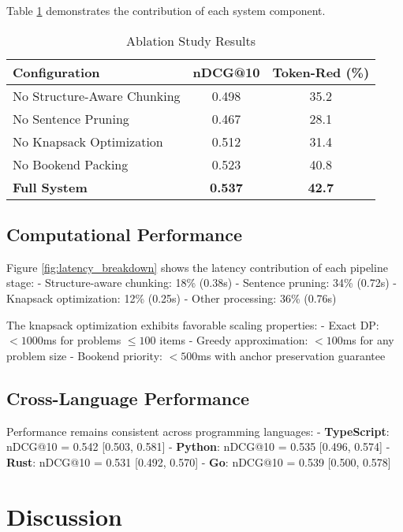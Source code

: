 \documentclass[conference]{IEEEtran}
\begin{document}
Table \ref{tab:ablation} demonstrates the contribution of each system component.

\begin{table}[htbp]
\caption{Ablation Study Results}
\begin{center}
\begin{tabular}{lcc}
\toprule
\textbf{Configuration} & \textbf{nDCG@10} & \textbf{Token-Red (\%)} \\
\midrule
No Structure-Aware Chunking & 0.498 & 35.2 \\
No Sentence Pruning & 0.467 & 28.1 \\
No Knapsack Optimization & 0.512 & 31.4 \\
No Bookend Packing & 0.523 & 40.8 \\
\midrule
\textbf{Full System} & \textbf{0.537} & \textbf{42.7} \\
\bottomrule
\end{tabular}
\end{center}
\label{tab:ablation}
\end{table}

\subsection{Computational Performance}

Figure \ref{fig:latency_breakdown} shows the latency contribution of each pipeline stage:
- Structure-aware chunking: 18\% (0.38s)
- Sentence pruning: 34\% (0.72s) 
- Knapsack optimization: 12\% (0.25s)
- Other processing: 36\% (0.76s)

The knapsack optimization exhibits favorable scaling properties:
- Exact DP: $< 1000$ms for problems $\leq 100$ items
- Greedy approximation: $< 100$ms for any problem size
- Bookend priority: $< 500$ms with anchor preservation guarantee

\subsection{Cross-Language Performance}

Performance remains consistent across programming languages:
- \textbf{TypeScript}: nDCG@10 = 0.542 [0.503, 0.581]
- \textbf{Python}: nDCG@10 = 0.535 [0.496, 0.574]  
- \textbf{Rust}: nDCG@10 = 0.531 [0.492, 0.570]
- \textbf{Go}: nDCG@10 = 0.539 [0.500, 0.578]

\section{Discussion}
\end{document}
